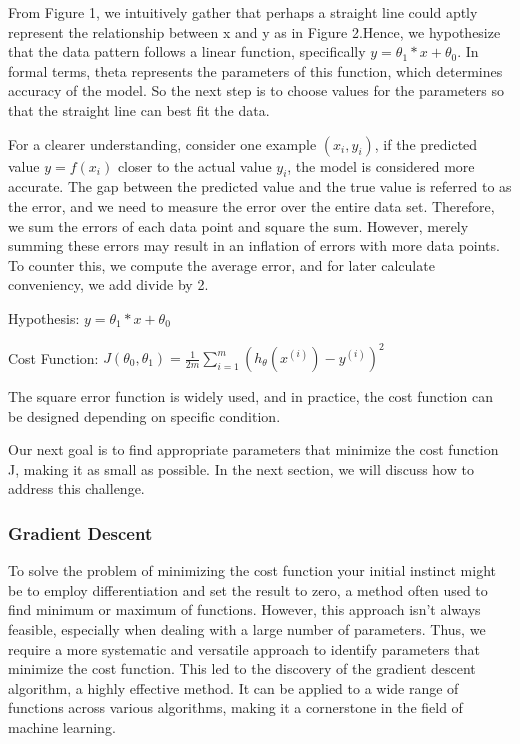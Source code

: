 \documentclass{article}
\begin{document}
     From Figure 1,  we intuitively gather that perhaps a straight line could aptly represent the relationship between x and y as in Figure 2.Hence, we hypothesize that the data pattern follows a linear function, specifically $ y = \theta_{1} * x  + \theta_{0}$. In formal terms, theta represents the parameters of this function, which determines accuracy of the model.  So the next step is to choose values for the parameters so that the straight line can best fit the data.

     For a clearer understanding, consider one example $(x_{i}, y_{i})$,   if the predicted value $y = f(x_{i})$ closer to the actual value $y_{i}$, the model is considered more accurate. The gap between the predicted value and the true value is referred to as the error, and we need to measure the error over the entire data set. Therefore, we sum the errors of each data point and square the sum. However, merely summing these errors may result in an inflation of errors with more data points. To counter this, we compute the average error, and for later calculate conveniency, we add divide by 2.


     \hspace*{\fill}

     Hypothesis:
     $ y = \theta_{1} * x  + \theta_{0}$
     \hspace*{\fill}

     \hspace*{\fill}

     Cost Function:
     $J\left(\theta_0, \theta_1\right)=\frac{1}{2 m} \sum_{i=1}^m\left(h_\theta\left(x^{(i)}\right)-y^{(i)}\right)^2$

     \hspace*{\fill}

     The square error function is widely used, and in practice, the cost function can be designed depending on specific condition.

    Our next goal is to find appropriate parameters that minimize the cost function J, making it as small as possible. In the next section, we will discuss how to address this challenge.


    \newpage
	\subsubsection{Gradient Descent}
    To solve the problem of minimizing the cost function your initial instinct might be to employ differentiation and set the result to zero, a method often used to find minimum or maximum of functions. However, this approach isn't always feasible, especially when dealing with a large number of parameters. Thus, we require a more systematic and versatile approach to identify parameters that minimize the cost function. This led to the discovery of the gradient descent algorithm, a highly effective method. It can be applied to a wide range of functions across various algorithms, making it a cornerstone in the field of machine learning.
\end{document}
